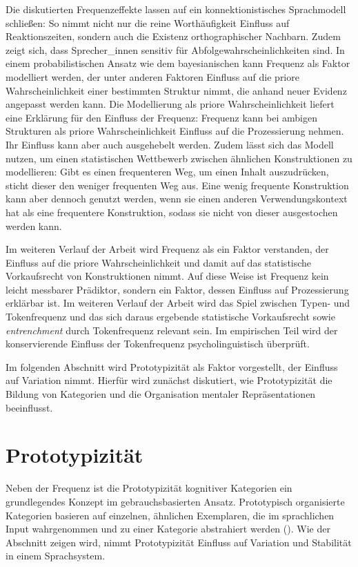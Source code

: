 Die diskutierten Frequenzeffekte lassen auf ein konnektionistisches Sprachmodell schließen: So nimmt nicht nur die reine Worthäufigkeit Einfluss auf Reaktionszeiten, sondern auch die Existenz orthographischer Nachbarn. Zudem zeigt sich, dass Sprecher\_innen sensitiv für Abfolgewahrscheinlichkeiten sind. In einem probabilistischen Ansatz wie dem bayesianischen kann Frequenz als Faktor modelliert werden, der unter anderen Faktoren Einfluss auf die priore Wahrscheinlichkeit einer bestimmten Struktur nimmt, die anhand neuer Evidenz angepasst werden kann. Die Modellierung als priore Wahrscheinlichkeit liefert eine Erklärung für den Einfluss der Frequenz: Frequenz kann bei ambigen Strukturen als priore Wahrscheinlichkeit Einfluss auf die Prozessierung nehmen. Ihr Einfluss kann aber auch ausgehebelt werden. Zudem lässt sich das Modell nutzen, um einen statistischen Wettbewerb zwischen ähnlichen Konstruktionen zu modellieren: Gibt es einen frequenteren Weg, um einen Inhalt auszudrücken, sticht dieser den weniger frequenten Weg aus. Eine wenig frequente Konstruktion kann aber dennoch genutzt werden, wenn sie einen anderen Verwendungskontext hat als eine frequentere Konstruktion, sodass sie nicht von dieser ausgestochen werden kann.

Im weiteren Verlauf der Arbeit wird Frequenz als ein Faktor verstanden, der Einfluss auf die priore Wahrscheinlichkeit und damit auf das statistische Vorkaufsrecht von Konstruktionen nimmt. Auf diese Weise ist Frequenz kein leicht messbarer Prädiktor, sondern ein Faktor, dessen Einfluss auf Prozessierung erklärbar ist. Im weiteren Verlauf der Arbeit wird das Spiel zwischen Typen- und Tokenfrequenz und das sich daraus ergebende statistische Vorkaufsrecht sowie \textit{entrenchment} durch Tokenfrequenz relevant sein. Im empirischen Teil wird der konservierende Einfluss der Tokenfrequenz psycholinguistisch überprüft. 

Im folgenden Abschnitt wird Prototypizität als Faktor vorgestellt, der Einfluss auf Variation nimmt. Hierfür wird zunächst diskutiert, wie Prototypizität die Bildung von Kategorien und die Organisation mentaler Repräsentationen beeinflusst. 

\section{Prototypizität}\label{steuerungprot}

Neben der Frequenz ist die Prototypizität kognitiver Kategorien ein grundlegendes Konzept im gebrauchsbasierten Ansatz. Prototypisch organisierte Kategorien basieren auf einzelnen, ähnlichen Exemplaren, die im sprachlichen Input wahrgenommen und zu einer Kategorie abstrahiert werden (\cite[56]{Ellis.2014}). Wie der Abschnitt zeigen wird, nimmt Prototypizität Einfluss auf Variation und Stabilität in einem Sprachsystem. 

